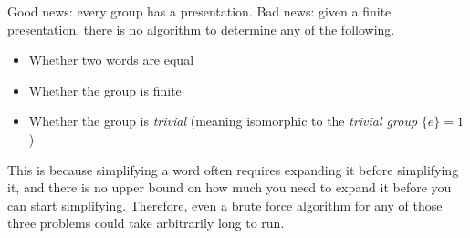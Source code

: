 \documentclass[class=article, crop=false]{standalone}
\begin{document}
\begin{thm}
    Good news: every group has a presentation. Bad news: given a finite presentation, there is no algorithm to determine any of the following.
    \begin{itemize}
        \item Whether two words are equal
        \item Whether the group is finite
        \item Whether the group is \emph{trivial} (meaning isomorphic to the \emph{trivial group} $\{e\}=1$)
    \end{itemize}
    \par
    This is because simplifying a word often requires expanding it before simplifying it, and there is no upper bound on how much you need to expand it before you can start simplifying. Therefore, even a brute force algorithm for any of those three problems could take arbitrarily long to run.
\end{thm}
\end{document}

